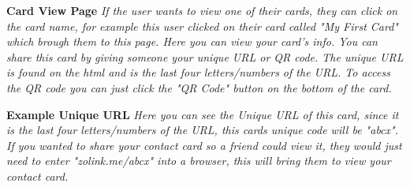 \documentclass[12pt]{article}%
\begin{document}
\begin{center}
		\clearpage
	{\bf \Large Card View Page}
	{\it If the user wants to view one of their cards, they can click on the card name, for example this user clicked on their card called "My First Card" 
	which brough them to this page. Here you can view your card's info. You can share this card by giving someone your unique URL or QR code. The unique
	URL is found on the html and is the last four letters/numbers of the URL. To access the QR code you can just click the "QR Code" button on the bottom
	of the card.}

		\clearpage
	{\bf \Large Example Unique URL}
	{\it Here you can see the Unique URL of this card, since it is the last four letters/numbers of the URL, this cards unique code will be "abcx". If you wanted
	to share your contact card so a friend could view it, they would just need to enter "zolink.me/abcx" into a browser, this will bring them to view your contact
	card.}
	

\end{center}
\end{document}
